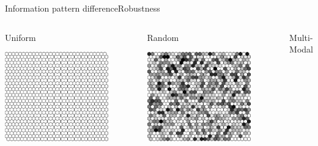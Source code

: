 \begin{frame}{Information pattern difference}{Robustness}

\begin{columns}

\begin{block}{Uniform}
\begin{center}
\includegraphics[width=0.8\textwidth]{./figure/ENV_UNI}
\end{center}
\end{block}
\begin{block}{Random}
\begin{center}
\includegraphics[width=0.8\textwidth]{./figure/ENV_RND}
\end{center}
\end{block}
\begin{block}{Multi-Modal}

\end{block}
\end{columns}
\end{frame}
